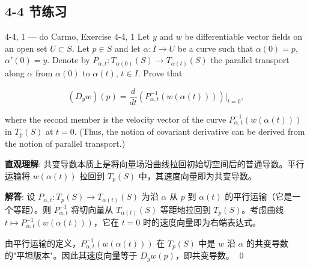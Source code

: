 \subsection*{4-4 节练习}

\begin{exercise}{4-4, 1 — do Carmo, Exercise 4-4, 1}
Let $y$ and $w$ be differentiable vector fields on an open set $U \subset S$. Let $p \in S$ and let $\alpha \colon I \to U$ be a curve such that $\alpha(0) = p$, $\alpha'(0) = y$. Denote by $P_{\alpha, t} \colon T_{\alpha(0)}(S) \to T_{\alpha(t)}(S)$ the parallel transport along $\alpha$ from $\alpha(0)$ to $\alpha(t)$, $t \in I$. Prove that

\[
(D_y w)(p) = \frac{d}{dt}\left(P_{\alpha, t}^{-1}(w(\alpha(t)))\right)\Bigg|_{t=0},
\]

where the second member is the velocity vector of the curve $P_{\alpha, t}^{-1}(w(\alpha(t)))$ in $T_p(S)$ at $t = 0$. (Thus, the notion of covariant derivative can be derived from the notion of parallel transport.)
\end{exercise}

\begin{solution}
\textbf{直观理解}: 共变导数本质上是将向量场沿曲线拉回初始切空间后的普通导数。平行运输将 $w(\alpha(t))$ 拉回到 $T_p(S)$ 中，其速度向量即为共变导数。

\textbf{解答}: 设 $P_{\alpha,t}: T_p(S) \to T_{\alpha(t)}(S)$ 为沿 $\alpha$ 从 $p$ 到 $\alpha(t)$ 的平行运输（它是一个等距）。则 $P_{\alpha,t}^{-1}$ 将切向量从 $T_{\alpha(t)}(S)$ 等距地拉回到 $T_p(S)$。考虑曲线 $t \mapsto P_{\alpha,t}^{-1}(w(\alpha(t)))$，它在 $t=0$ 时的速度向量即为右端表达式。

由平行运输的定义，$P_{\alpha,t}^{-1}(w(\alpha(t)))$ 在 $T_p(S)$ 中是 $w$ 沿 $\alpha$ 的共变导数的"平坦版本"。因此其速度向量等于 $D_yw(p)$，即共变导数。
\qed
\end{solution}

